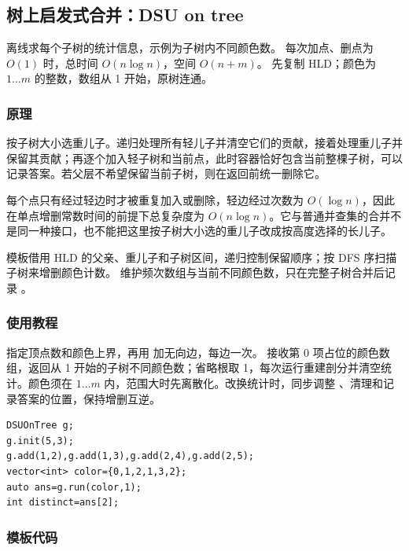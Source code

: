 \subsection{树上启发式合并：DSU on tree}
\label{tree:dsu-on-tree}
\AlgorithmInfo
    {离线求每个子树的统计信息，示例为子树内不同颜色数。}
    {每次加点、删点为 $O(1)$ 时，总时间 $O(n\log n)$，空间 $O(n+m)$。}
    {先复制 HLD；颜色为 $1\ldots m$ 的整数，数组从 1 开始，原树连通。}
\subsubsection*{原理}
按子树大小选重儿子。递归处理所有轻儿子并清空它们的贡献，接着处理重儿子并保留其贡献；再逐个加入轻子树和当前点，此时容器恰好包含当前整棵子树，可以记录答案。若父层不希望保留当前子树，则在返回前统一删除它。

每个点只有经过轻边时才被重复加入或删除，轻边经过次数为 $O(\log n)$，因此在单点增删常数时间的前提下总复杂度为 $O(n\log n)$。它与普通并查集的合并不是同一种接口，也不能把这里按子树大小选的重儿子改成按高度选择的长儿子。

模板借用 HLD 的父亲、重儿子和子树区间，递归控制保留顺序；按 DFS 序扫描子树来增删颜色计数。 维护频次数组与当前不同颜色数，只在完整子树合并后记录 。
\subsubsection*{使用教程}
 指定顶点数和颜色上界，再用  加无向边，每边一次。 接收第 0 项占位的颜色数组，返回从 1 开始的子树不同颜色数；省略根取 1，每次运行重建剖分并清空统计。颜色须在 $1\ldots m$ 内，范围大时先离散化。改换统计时，同步调整 、清理和记录答案的位置，保持增删互逆。
\begin{lstlisting}[style=mtycpp,numbers=none]
DSUOnTree g;
g.init(5,3);
g.add(1,2),g.add(1,3),g.add(2,4),g.add(2,5);
vector<int> color={0,1,2,1,3,2};
auto ans=g.run(color,1);
int distinct=ans[2];
\end{lstlisting}
\subsubsection*{模板代码}
